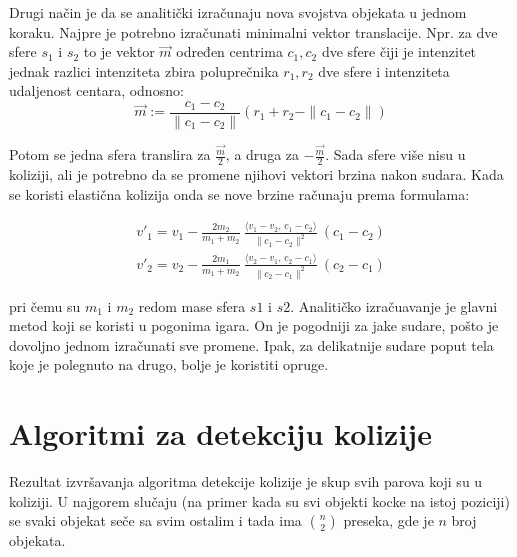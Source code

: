 \documentclass[12pt,oneside]{memoir}
\begin{document}
Drugi način je da se analitički izračunaju nova svojstva objekata u jednom koraku.
Najpre je potrebno izračunati minimalni vektor translacije. Npr. za dve sfere $s_1$ i $s_2$ to je vektor $\vec{m}$
određen centrima $c_1, c_2$ dve sfere čiji je intenzitet jednak razlici intenziteta zbira poluprečnika
$r_1, r_2$ dve sfere i intenziteta udaljenost centara, odnosno:
\begin{equation}
	\label{eq:razresenje2}
	 \vec{m} := \frac{{c_1 - c_2}} {\|{c_1 - c_2}\|} 
	(r_1 + r_2 - \| {c_1 - c_2} \| ) 
\end{equation}

Potom se jedna sfera translira za $ \frac{ \vec{m} }{ 2 }$, a druga za $ -\frac{ \vec{m} }{ 2 }$.
Sada sfere više nisu u koliziji, ali je potrebno da se promene njihovi vektori brzina nakon sudara.
Kada se koristi elastična kolizija onda se nove brzine računaju prema formulama:


\begin{equation}
	\label{eq:razresenje}
	\begin{split}
		{v}'_1= {v}_1-\frac{2 m_2}{m_1+m_2} \ \frac{\langle  {v}_1- {v}_2,\, {c}_1- {c}_2\rangle}{\| {c}_1- {c}_2\|^2} \ ( {c}_1- {c}_2) \\
		{v}'_2= {v}_2-\frac{2 m_1}{m_1+m_2} \ \frac{\langle  {v}_2- {v}_1,\, {c}_2- {c}_1\rangle}{\| {c}_2- {c}_1\|^2} \ ( {c}_2- {c}_1) 
	\end{split}
\end{equation}


pri čemu su $m_1$ i $m_2$ redom mase sfera $s1$ i $s2$.
Analitičko izračuavanje je glavni metod koji se koristi u pogonima igara.
On je pogodniji za jake sudare, pošto je dovoljno jednom izračunati sve promene.
Ipak, za delikatnije sudare poput tela koje je polegnuto na drugo, bolje je koristiti opruge.

\chapter{Algoritmi za detekciju kolizije}
\label{sec:algoritmi}

Rezultat izvršavanja algoritma detekcije kolizije je skup svih parova koji su u koliziji.
U najgorem slučaju (na primer kada su svi objekti kocke na istoj poziciji) se svaki objekat
seče sa svim ostalim i tada ima $ {n\choose 2}  $ preseka, gde je $n$ broj objekata. 
\end{document}
